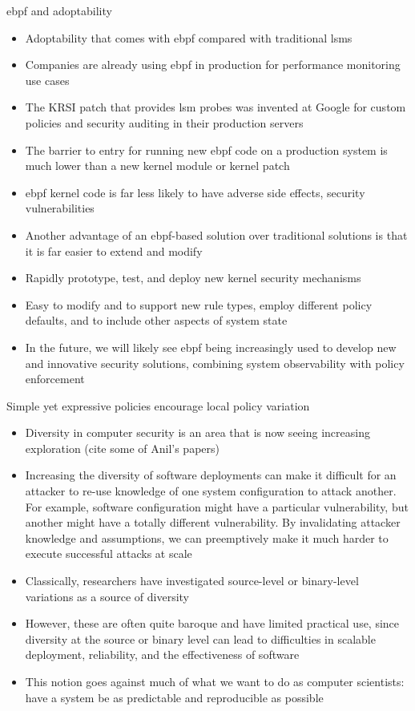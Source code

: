 \begin{inprogress}
  \gls{ebpf} and adoptability
  \begin{itemize}
    \item Adoptability that comes with \gls{ebpf} compared with traditional \glspl{lsm}
    \item Companies are already using \gls{ebpf} in production for performance monitoring use cases
    \item The KRSI patch that provides \gls{lsm} probes was invented at Google for custom policies and security auditing in their production servers
    \item The barrier to entry for running new \gls{ebpf} code on a production system is much lower than a new kernel module or kernel patch
    \item \gls{ebpf} kernel code is far less likely to have adverse side effects, security vulnerabilities

    \item Another advantage of an \gls{ebpf}-based solution over traditional solutions is that it is far easier to extend and modify
    \item Rapidly prototype, test, and deploy new kernel security mechanisms
    \item Easy to modify \bpfbox{} and \bpfcontain{} to support new rule types, employ different policy defaults, and to include other aspects of system state
    \item In the future, we will likely see \gls{ebpf} being increasingly used to develop new and innovative security solutions, combining
    system observability with policy enforcement
  \end{itemize}

  Simple yet expressive policies encourage local policy variation
  \begin{itemize}
    \item Diversity in computer security is an area that is now seeing increasing exploration (cite some of Anil's papers)
    \item Increasing the diversity of software deployments can make it difficult for an attacker to re-use knowledge of one
    system configuration to attack another. For example, software configuration might have a particular vulnerability, but
    another might have a totally different vulnerability. By invalidating attacker knowledge and assumptions, we can preemptively
    make it much harder to execute successful attacks at scale

    \item Classically, researchers have investigated source-level or binary-level variations as a source of diversity
    \item However, these are often quite baroque and have limited practical use, since diversity at the source or binary level can
    lead to difficulties in scalable deployment, reliability, and the effectiveness of software
    \item This notion goes against much of what we want to do as computer scientists: have a system be as predictable and reproducible as possible


\end{itemize}
\end{inprogress}
